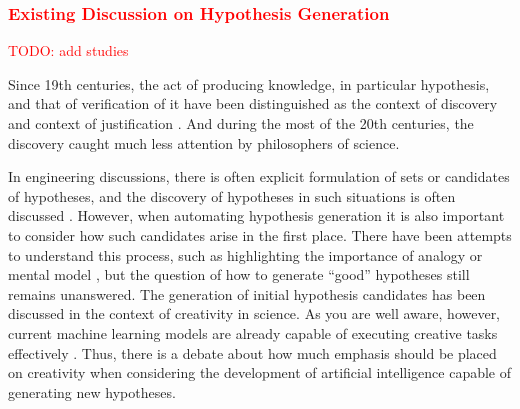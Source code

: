 \documentclass{book}
\begin{document}

\subsubsection{\textcolor{red}{Existing Discussion on Hypothesis Generation}}
\textcolor{red}{TODO: add studies}


Since 19th centuries, the act of producing knowledge, in particular hypothesis, and that of verification of it have been distinguished as the context of discovery and context of justification \cite{sep-scientific-discovery}. And during the most of the 20th centuries, the discovery caught much less attention by philosophers of science. 

In engineering discussions, there is often explicit formulation of sets or candidates of hypotheses, and the discovery of hypotheses in such situations is often discussed \cite{simon1973does,kitano2021nobel,bengio2022ml4sci}. However, when automating hypothesis generation it is also important to consider how such candidates arise in the first place. There have been attempts to understand this process, such as highlighting the importance of analogy \cite{thagard1984conceptual} or mental model \cite{nersessian1999model}, but the question of how to generate ``good'' hypotheses still remains unanswered. The generation of initial hypothesis candidates has been discussed in the context of creativity in science. As you are well aware, however, current machine learning models are already capable of executing creative tasks effectively \cite{sep-creativity}. Thus, there is a debate about how much emphasis should be placed on creativity when considering the development of artificial intelligence capable of generating new hypotheses.
\end{document}
